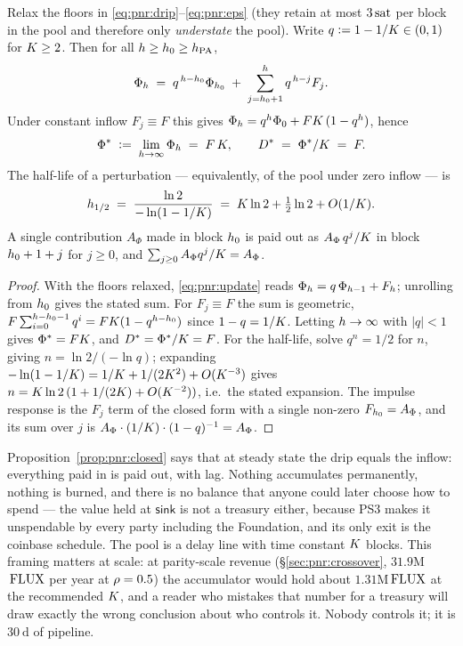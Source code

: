 \begin{proposition}
\label{prop:pnr:closed}
Relax the floors in \eqref{eq:pnr:drip}--\eqref{eq:pnr:eps} (they retain at most $3\,\mathrm{sat}$ per block in
the pool and therefore only \emph{understate} the pool). Write $q \vcentcolon= 1 - 1/K \in (0,1)$ for
$K \ge 2$. Then for all $h \ge h_0 \ge h_{\mathrm{PA}}$,
\[
  \Phi_{h} \;=\; q^{\,h - h_0}\Phi_{h_0}
    \;+\; \sum_{j = h_0+1}^{h} q^{\,h - j} F_j .
\]
Under constant inflow $F_j \equiv F$ this gives
$\Phi_{h} = q^{h}\Phi_0 + FK\,(1 - q^{h})$, hence
\[
  \Phi^{*} \;\vcentcolon=\; \lim_{h \to \infty}\Phi_{h} \;=\; F\,K ,
  \qquad
  D^{*} \;=\; \Phi^{*}/K \;=\; F .
\]
The half-life of a perturbation --- equivalently, of the pool under zero inflow --- is
\[
  h_{1/2} \;=\; \frac{\ln 2}{-\ln(1 - 1/K)} \;=\; K \ln 2 + \tfrac12 \ln 2 + O(1/K).
\]
A single contribution $A_\Phi$ made in block $h_0$ is paid out as $A_\Phi\,q^{j}/K$ in block
$h_0 + 1 + j$ for $j \ge 0$, and $\sum_{j \ge 0} A_\Phi q^{j}/K = A_\Phi$.
\end{proposition}

\begin{proof}
With the floors relaxed, \eqref{eq:pnr:update} reads $\Phi_{h} = q\,\Phi_{h-1} + F_{h}$;
unrolling from $h_0$ gives the stated sum. For $F_j \equiv F$ the sum is geometric,
$F\sum_{i=0}^{h - h_0 - 1} q^{i} = FK(1 - q^{h - h_0})$ since
$1 - q = 1/K$. Letting $h \to \infty$ with $|q| < 1$ gives $\Phi^{*} = FK$, and
$D^{*} = \Phi^{*}/K = F$. For the half-life, solve $q^{n} = 1/2$ for $n$, giving
$n = \ln 2 / (-\ln q)$; expanding $-\ln(1 - 1/K) = 1/K + 1/(2K^{2}) + O(K^{-3})$
gives $n = K\ln 2 \,(1 + 1/(2K) + O(K^{-2}))$, i.e.\ the stated expansion. The impulse
response is the $F_j$ term of the closed form with a single non-zero $F_{h_0} = A_\Phi$, and its
sum over $j$ is $A_\Phi \cdot (1/K)\cdot (1-q)^{-1} = A_\Phi$.
\end{proof}

\begin{remark}
\label{rem:pnr:delayline}
Proposition~\ref{prop:pnr:closed} says that at steady state the drip equals the inflow: everything
paid in is paid out, with lag. Nothing accumulates permanently, nothing is burned, and there is no
balance that anyone could later choose how to spend --- the value held at $\mathsf{sink}$ is not a
treasury either, because PS3 makes it unspendable by every party including the Foundation, and its
only exit is the coinbase schedule. The pool is a delay line with time constant
$K$ blocks. This framing matters at scale: at parity-scale revenue
(\S\ref{sec:pnr:crossover}, $31.9$M$\,\mathrm{FLUX}$ per year at $\rho = 0.5$) the accumulator would
hold about $1.31$M$\,\mathrm{FLUX}$ at the recommended $K$, and a reader who mistakes that number for a
treasury will draw exactly the wrong conclusion about who controls it. Nobody controls it; it is
$\SI{30}{\day}$ of pipeline.
\end{remark}

